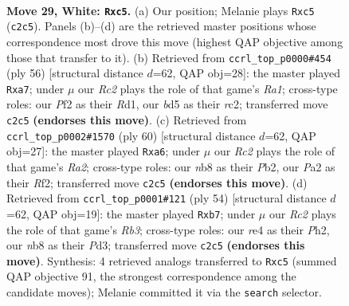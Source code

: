 \documentclass[11pt]{article}
\begin{document}
\clearpage

\begin{figure}[p]\centering
\begin{subfigure}{0.46\textwidth}\centering
\resizebox{\linewidth}{!}{%
\newchessgame
\chessboard[
  setfen={rn4k1/8/4p3/1Bpb1p1p/4r3/6BP/PRR2P2/6K1 w - - 0 29},
  showmover=false,
  pgfstyle=straightmove, color=movearrow, markmove={c2-c5}
]}
\caption{}
\end{subfigure}\hfill
\begin{subfigure}{0.46\textwidth}\centering
\resizebox{\linewidth}{!}{%
\newchessgame
\chessboard[
  setfen={2r3k1/p4p2/2p1p1bp/2P5/3P4/4PB1P/2r5/R2R2K1 w - - 4 29},
  showmover=false,
  pgfstyle=straightmove, color=movearrow, markmove={a1-a7}
]}
\caption{}
\end{subfigure}
\\[4pt]
\begin{subfigure}{0.46\textwidth}\centering
\resizebox{\linewidth}{!}{%
\newchessgame
\chessboard[
  setfen={1r4k1/2p5/p2b2p1/3Pp1Pn/1r6/2N1BP2/RP3RK1/8 w - - 1 31},
  showmover=false,
  pgfstyle=straightmove, color=movearrow, markmove={a2-a6}
]}
\caption{}
\end{subfigure}\hfill
\begin{subfigure}{0.46\textwidth}\centering
\resizebox{\linewidth}{!}{%
\newchessgame
\chessboard[
  setfen={8/1pp2k1p/2r2PbB/4p3/r7/1R1P4/4PR1P/6K1 w - - 0 28},
  showmover=false,
  pgfstyle=straightmove, color=movearrow, markmove={b3-b7}
]}
\caption{}
\end{subfigure}
\caption{\textbf{Move 29, White: \texttt{Rxc5}.} (a) Our position; Melanie plays \texttt{Rxc5} (\texttt{c2c5}). Panels (b)--(d) are the retrieved master positions whose correspondence most drove this move (highest QAP objective among those that transfer to it). (b) Retrieved from \texttt{ccrl\_top\_p0000\#454} (ply 56) [structural distance $d$=62, QAP obj=28]: the master played \texttt{Rxa7}; under $\mu$ our \emph{Rc2} plays the role of that game's \emph{Ra1}; cross-type roles: our \emph{P}f2 as their \emph{R}d1, our \emph{b}d5 as their \emph{r}c2; transferred move \texttt{c2c5} \textbf{(endorses this move)}. (c) Retrieved from \texttt{ccrl\_top\_p0002\#1570} (ply 60) [structural distance $d$=62, QAP obj=27]: the master played \texttt{Rxa6}; under $\mu$ our \emph{Rc2} plays the role of that game's \emph{Ra2}; cross-type roles: our \emph{n}b8 as their \emph{P}b2, our \emph{P}a2 as their \emph{R}f2; transferred move \texttt{c2c5} \textbf{(endorses this move)}. (d) Retrieved from \texttt{ccrl\_top\_p0001\#121} (ply 54) [structural distance $d$=62, QAP obj=19]: the master played \texttt{Rxb7}; under $\mu$ our \emph{Rc2} plays the role of that game's \emph{Rb3}; cross-type roles: our \emph{r}e4 as their \emph{P}h2, our \emph{n}b8 as their \emph{P}d3; transferred move \texttt{c2c5} \textbf{(endorses this move)}. Synthesis: 4 retrieved analogs transferred to \texttt{Rxc5} (summed QAP objective 91, the strongest correspondence among the candidate moves); Melanie committed it via the \texttt{search} selector.}
\label{fig:thought-m56}
\end{figure}
\end{document}
